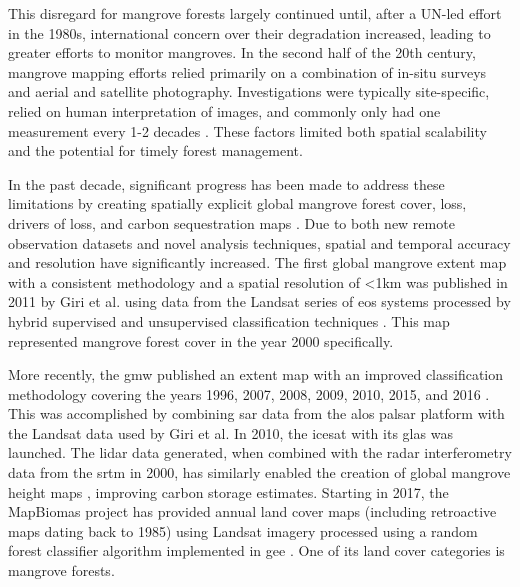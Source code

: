 This disregard for mangrove forests largely continued until, after a UN-led effort in the 1980s, international concern over their degradation increased, leading to greater efforts to monitor mangroves. In the second half of the 20th century, mangrove mapping efforts relied primarily on a combination of in-situ surveys and aerial and satellite photography. Investigations were typically site-specific, relied on human interpretation of images, and commonly only had one measurement every 1-2 decades \cite{lacerdaluizandmenezesmarceloandmussimolisanimauricioChangesMangroveExtension2007, fromardHalfCenturyDynamic2004}. These factors limited both spatial scalability and the potential for timely forest management. 

In the past decade, significant progress has been made to address these limitations by creating spatially explicit global mangrove forest cover, loss, drivers of loss, and carbon sequestration maps \cite{spaldingWorldAtlasMangroves2010, donatoMangrovesMostCarbonrich2011, sandermanGlobalMapMangrove2018, simardMangroveCanopyHeight2019, goldbergGlobalDeclinesHuman2020}. Due to both new remote observation datasets and novel analysis techniques, spatial and temporal accuracy and resolution have significantly increased. The first global mangrove extent map with a consistent methodology and a spatial resolution of <1km was published in 2011 by Giri et al. using data from the Landsat series of \acp{eo} systems processed by hybrid supervised and unsupervised classification techniques \cite{giriStatusDistributionMangrove2011}. This map represented mangrove forest cover in the year 2000 specifically. 

More recently, the \ac{gmw} published an extent map with an improved classification methodology covering the years 1996, 2007, 2008, 2009, 2010, 2015, and 2016 \cite{buntingGlobalMangroveWatch2018}. This was accomplished by combining \ac{sar} data from the \ac{alos} \ac{palsar} platform with the Landsat data used by Giri et al. In 2010, the \ac{icesat} with its \ac{glas} was launched. The lidar data generated, when combined with the radar interferometry data from the \ac{srtm} in 2000, has similarly enabled the creation of global mangrove height maps \cite{simardMangroveCanopyHeight2019}, improving carbon storage estimates. Starting in 2017, the MapBiomas project has provided annual land cover maps (including retroactive maps dating back to 1985) using Landsat imagery processed using a random forest classifier algorithm implemented in \ac{gee} \cite{raisg-mapbiomasconsortiumMapBiomasAmazoniaProject2021}. One of its land cover categories is mangrove forests. 

